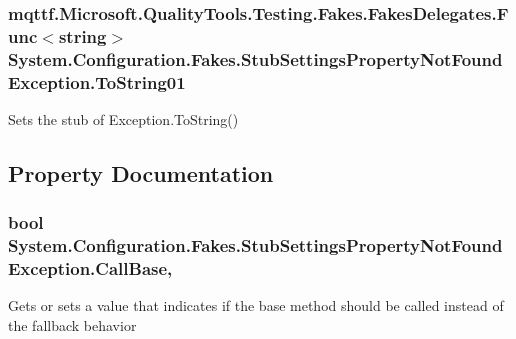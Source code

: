 \hypertarget{class_system_1_1_configuration_1_1_fakes_1_1_stub_settings_property_not_found_exception_a38aa858dd87ebd03fdd48961eeb390bb}{
\subsubsection[{To\-String01}]{\setlength{\rightskip}{0pt plus 5cm}mqttf.\-Microsoft.\-Quality\-Tools.\-Testing.\-Fakes.\-Fakes\-Delegates.\-Func$<$string$>$ System.\-Configuration.\-Fakes.\-Stub\-Settings\-Property\-Not\-Found\-Exception.\-To\-String01}}\label{class_system_1_1_configuration_1_1_fakes_1_1_stub_settings_property_not_found_exception_a38aa858dd87ebd03fdd48961eeb390bb}


Sets the stub of Exception.\-To\-String()



\subsection{Property Documentation}
\hypertarget{class_system_1_1_configuration_1_1_fakes_1_1_stub_settings_property_not_found_exception_aeda0a51f730418575fa05853aa635fcb}{
\subsubsection[{Call\-Base}]{\setlength{\rightskip}{0pt plus 5cm}bool System.\-Configuration.\-Fakes.\-Stub\-Settings\-Property\-Not\-Found\-Exception.\-Call\-Base\hspace{0.3cm}{\ttfamily [get]}, {\ttfamily [set]}}}\label{class_system_1_1_configuration_1_1_fakes_1_1_stub_settings_property_not_found_exception_aeda0a51f730418575fa05853aa635fcb}


Gets or sets a value that indicates if the base method should be called instead of the fallback behavior

